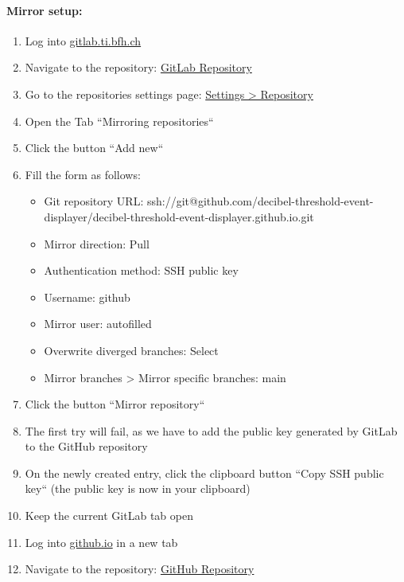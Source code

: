 \paragraph{Mirror setup:}
\begin{enumerate}
    \item Log into \href{https://gitlab.ti.bfh.ch}{gitlab.ti.bfh.ch}
    \item Navigate to the repository: \href{https://gitlab.ti.bfh.ch/decibel-threshold-event-displayer/decibel-threshold-event-displayer/}{GitLab Repository}
    \item Go to the repositories settings page: \href{https://gitlab.ti.bfh.ch/decibel-threshold-event-displayer/decibel-threshold-event-displayer/-/settings/repository}{Settings > Repository}
    \item Open the Tab ``Mirroring repositories``
    \item Click the button ``Add new``
    \item Fill the form as follows:
          \begin{itemize}
              \item Git repository URL: ssh://git@github.com/decibel-threshold-event-displayer/decibel-threshold-event-displayer.github.io.git
              \item Mirror direction: Pull
              \item Authentication method: SSH public key
              \item Username: github
              \item Mirror user: autofilled
              \item Overwrite diverged branches: Select
              \item Mirror branches > Mirror specific branches: main
          \end{itemize}
    \item Click the button ``Mirror repository``
    \item The first try will fail, as we have to add the public key generated by GitLab to the GitHub repository
    \item On the newly created entry, click the clipboard button ``Copy SSH public key`` (the public key is now in your clipboard)
    \item Keep the current GitLab tab open
    \item Log into \href{https://github.com/}{github.io} in a new tab
    \item Navigate to the repository: \href{https://github.com/decibel-threshold-event-displayer/decibel-threshold-event-displayer.github.io/}{GitHub Repository}

\end{enumerate}
